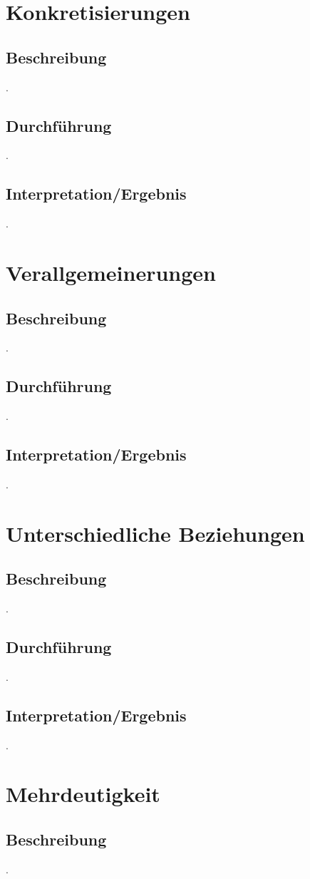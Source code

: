 \documentclass[12pt,a4paper]{report}
\begin{document}
	\section{Konkretisierungen}
		\subsection{Beschreibung}
		.
		\subsection{Durchführung}
		.
		\subsection{Interpretation/Ergebnis}
		.
	\newpage
	\section{Verallgemeinerungen}
		\subsection{Beschreibung}
		.
		\subsection{Durchführung}
		.
		\subsection{Interpretation/Ergebnis}
		.
	\newpage
	\section{Unterschiedliche Beziehungen}
		\subsection{Beschreibung}
		.
		\subsection{Durchführung}
		.
		\subsection{Interpretation/Ergebnis}
		.
	\newpage
	\section{Mehrdeutigkeit}
		\subsection{Beschreibung}
		.
\end{document}
